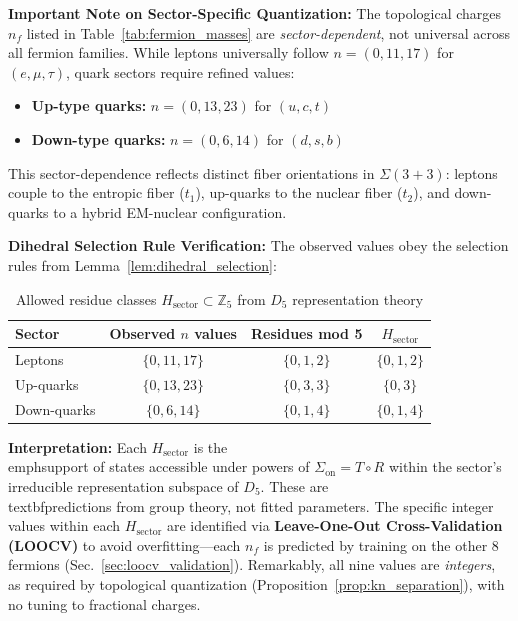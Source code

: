 \documentclass[12pt]{article}
\theoremstyle{definition}
\theoremstyle{plain}
\begin{document}
\textbf{Important Note on Sector-Specific Quantization:} The topological charges $n_f$ listed in Table~\ref{tab:fermion_masses} are \textit{sector-dependent}, not universal across all fermion families. While leptons universally follow $n = (0, 11, 17)$ for $(e, \mu, \tau)$, quark sectors require refined values:
\begin{itemize}
\item \textbf{Up-type quarks:} $n = (0, 13, 23)$ for $(u, c, t)$
\item \textbf{Down-type quarks:} $n = (0, 6, 14)$ for $(d, s, b)$
\end{itemize}

This sector-dependence reflects distinct fiber orientations in $\Sigma(3+3)$: leptons couple to the entropic fiber ($t_1$), up-quarks to the nuclear fiber ($t_2$), and down-quarks to a hybrid EM-nuclear configuration. 

\textbf{Dihedral Selection Rule Verification:} The observed values obey the selection rules from Lemma~\ref{lem:dihedral_selection}:

\begin{table}[H]
\centering
\caption{Allowed residue classes $H_{\text{sector}} \subset \mathbb{Z}_5$ from $D_5$ representation theory}
\small
\begin{tabular}{lccc}
\toprule
\textbf{Sector} & \textbf{Observed $n$ values} & \textbf{Residues mod 5} & \textbf{$H_{\text{sector}}$} \\
\midrule
Leptons & $\{0, 11, 17\}$ & $\{0, 1, 2\}$ & $\{0, 1, 2\}$ \\
Up-quarks & $\{0, 13, 23\}$ & $\{0, 3, 3\}$ & $\{0, 3\}$ \\
Down-quarks & $\{0, 6, 14\}$ & $\{0, 1, 4\}$ & $\{0, 1, 4\}$ \\
\bottomrule
\end{tabular}
\label{tab:dihedral_selection}
\end{table}

\textbf{Interpretation:} Each $H_{\text{sector}}$ is the \\emph{support} of states accessible under powers of $\Sigma_{\text{on}} = T \circ R$ within the sector's irreducible representation subspace of $D_5$. These are \\textbf{predictions from group theory}, not fitted parameters. The specific integer values within each $H_{\text{sector}}$ are identified via \textbf{Leave-One-Out Cross-Validation (LOOCV)} to avoid overfitting—each $n_f$ is predicted by training on the other 8 fermions (Sec.~\ref{sec:loocv_validation}). Remarkably, all nine values are \textit{integers}, as required by topological quantization (Proposition~\ref{prop:kn_separation}), with no tuning to fractional charges.
\end{document}
